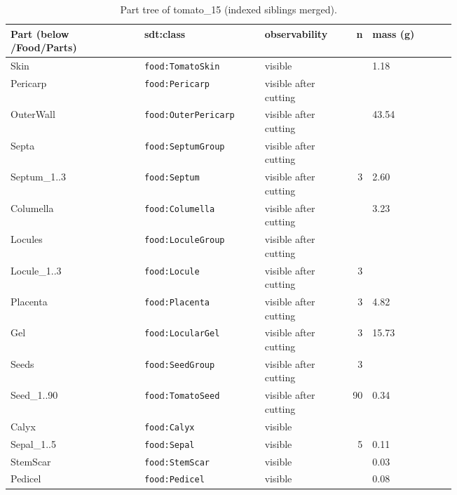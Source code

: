 \documentclass[10.5pt,a4paper]{article}
\begin{document}
\begin{table}[htbp]\centering\scriptsize\caption{Part tree of tomato\_15 (indexed siblings merged).}
\begin{tabularx}{\linewidth}{@{}p{0.30\linewidth}p{0.27\linewidth}p{0.17\linewidth}rX@{}}\toprule Part (below /Food/Parts) & sdt:class & observability & n & mass (g) \\\midrule
\hspace*{0.0em}Skin & \texttt{food:TomatoSkin} & visible &  & 1.18 \\
\hspace*{0.0em}Pericarp & \texttt{food:Pericarp} & visible after cutting &  &  \\
\hspace*{0.9em}OuterWall & \texttt{food:OuterPericarp} & visible after cutting &  & 43.54 \\
\hspace*{0.9em}Septa & \texttt{food:SeptumGroup} & visible after cutting &  &  \\
\hspace*{1.8em}Septum\_1..3 & \texttt{food:Septum} & visible after cutting & 3 & 2.60 \\
\hspace*{0.9em}Columella & \texttt{food:Columella} & visible after cutting &  & 3.23 \\
\hspace*{0.0em}Locules & \texttt{food:LoculeGroup} & visible after cutting &  &  \\
\hspace*{0.9em}Locule\_1..3 & \texttt{food:Locule} & visible after cutting & 3 &  \\
\hspace*{1.8em}Placenta & \texttt{food:Placenta} & visible after cutting & 3 & 4.82 \\
\hspace*{1.8em}Gel & \texttt{food:LocularGel} & visible after cutting & 3 & 15.73 \\
\hspace*{1.8em}Seeds & \texttt{food:SeedGroup} & visible after cutting & 3 &  \\
\hspace*{2.7em}Seed\_1..90 & \texttt{food:TomatoSeed} & visible after cutting & 90 & 0.34 \\
\hspace*{0.0em}Calyx & \texttt{food:Calyx} & visible &  &  \\
\hspace*{0.9em}Sepal\_1..5 & \texttt{food:Sepal} & visible & 5 & 0.11 \\
\hspace*{0.0em}StemScar & \texttt{food:StemScar} & visible &  & 0.03 \\
\hspace*{0.0em}Pedicel & \texttt{food:Pedicel} & visible &  & 0.08 \\\bottomrule\end{tabularx}\end{table}
\end{document}
